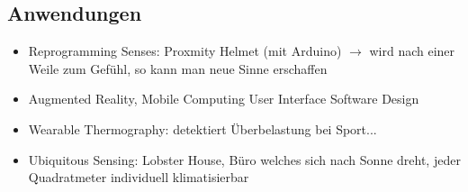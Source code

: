 \subsection{Anwendungen}
\begin{itemize}
	\item Reprogramming Senses: Proxmity Helmet (mit Arduino) $\rightarrow$ wird nach einer Weile zum Gefühl, so kann man neue Sinne erschaffen
	\item Augmented Reality, Mobile Computing User Interface Software Design
	\item Wearable Thermography: detektiert Überbelastung bei Sport...
	\item Ubiquitous Sensing: Lobster House, Büro welches sich nach Sonne dreht, jeder Quadratmeter individuell klimatisierbar
\end{itemize}



